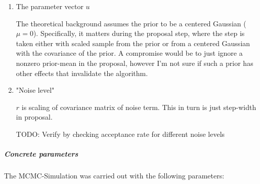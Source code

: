 \documentclass[11pt]{article}
\begin{document}
\begin{enumerate}
\item The parameter vector \(u\)
\label{sec:org6fc777e}

The theoretical background assumes the prior to be a centered Gaussian (\(\mu = 0\)).
Specifically, it matters during the proposal step, where the step is taken either with
scaled sample from the prior or from a centered Gaussian with the covariance of the prior.
A compromise would be to just ignore a nonzero prior-mean in the proposal, however I'm not
sure if such a prior has other effects that invalidate the algorithm.

\item "Noise level"
\label{sec:orgf559194}

\(r\) is scaling of covariance matrix of noise term. This in turn is just step-width in proposal.

TODO: Verify by checking acceptance rate for different noise levels
\end{enumerate}

\subparagraph{Concrete parameters}
\label{sec:orge638f2a}

The MCMC-Simulation was carried  out with the following parameters:
\end{document}
